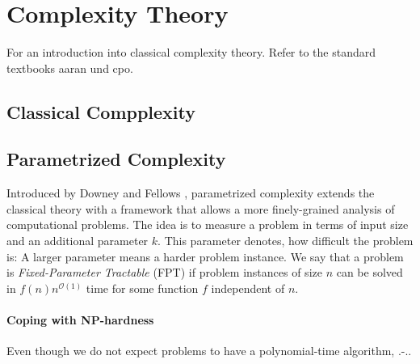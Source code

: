 \section{Complexity Theory}

For an introduction into classical complexity theory. Refer to the standard textbooks aaran und cpo.

\subsection{Classical Compplexity}

\subsection{Parametrized Complexity}

Introduced by Downey and Fellows \cite{Downey1999a}, parametrized complexity extends the classical theory with a framework that allows a more finely-grained analysis of computational problems. The idea is to measure a problem in terms of input size and an additional parameter $k$. This parameter denotes, how difficult the problem is: A larger parameter means a harder problem instance. We say that a problem is \textit{Fixed-Parameter Tractable} (FPT) if problem instances of size $n$ can be solved in $f(n)n^{\mathcal{O}(1)}$ time for some function $f$ independent of $n$. 

\paragraph{Coping with NP-hardness}

Even though we do not expect \NPc problems to have a polynomial-time algorithm, .-..

\begin{center}
\end{center}


